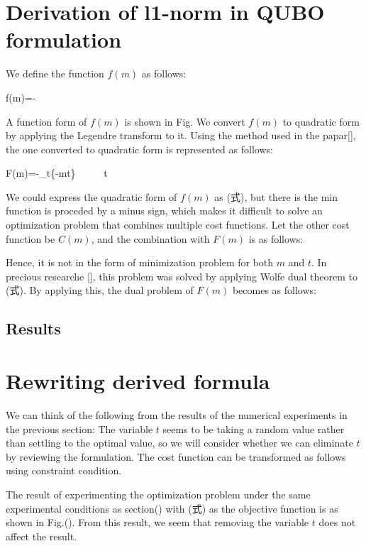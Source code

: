 \documentclass[fp,twocolumn]{jpsj3}
\begin{document}
\section{Derivation of l1-norm in QUBO formulation} %
We define the function $f(m)$ as follows:
\begin{}
  f(m)=-
\end{}
A function form of $f(m)$ is shown in Fig. We convert $f(m)$ to quadratic form by applying the Legendre transform to it. Using the method used in the papar[], the one converted to quadratic form is represented as follows:
\begin{}
  F(m)=-\min_{t}{\{-mt\}} \  \  \  \leq t 
\end{}
We could express the quadratic form of $f(m)$ as (式), but there is the min function is proceded by a minus sign, which makes it difficult to solve an optimization problem that combines multiple cost functions. Let the other cost function be $C(m)$, and the combination with $F(m)$ is as follows:
\begin{}
\end{}
Hence, it is not in the form of minimization problem for both $m$ and $t$.
In precious researche [], this problem was solved by applying Wolfe dual theorem to (式). By applying this, the dual problem of $F(m)$ becomes as follows:
\begin{}
\end{}


\subsection{Results} %

\section{Rewriting derived formula} %
We can think of the following from the results of the numerical experiments in the previous section: The variable $t$ seems to be taking a random value rather than settling to the optimal value, so we will consider whether we can eliminate $t$ by reviewing the formulation. 
The cost function can be transformed as follows using constraint condition.
\begin{}
\end{}

The result of experimenting the optimization problem under the same experimental conditions as section() with (式) as the objective function is as shown in Fig.(). From this result, we seem that removing the variable $t$ does not affect the result. 
\end{document}
